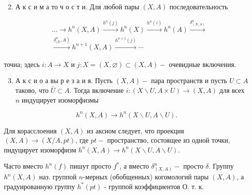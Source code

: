 \documentclass[10pt]{article}
\begin{document}
\begin{enumerate}

  \setcounter{enumi}{1}

  \item А к с и м а то ч о с т и. Для любой пары $(X, A)$ последовательность

\end{enumerate}



\[

\begin{aligned}

& \ldots \rightarrow h^{n}(X, A) \stackrel{h^{n}(j)}{\longrightarrow} h^{n}(X) \stackrel{h^{n}(i)}{\longrightarrow} h^{n}(A) \stackrel{\delta_{(X, A)}^{n}}{\longrightarrow} \\

& \stackrel{\left.\delta_{(X}^{n}, A\right)}{\longrightarrow} h^{n+1}(X, A) \stackrel{h^{n+1}(j)}{\longrightarrow} \cdots

\end{aligned}

\]



точна; здесь $i: A \rightarrow X$ и $j: X=(X, \varnothing) \subset(X, A)-$ очевидные включения.



\begin{enumerate}

  \setcounter{enumi}{2}

  \item А к с и о а вы р е з а и я. Пусть $(X, A)-$ пара пространств и пусть $U \subset A$ таково, что $\bar{U} \subset A$. Тогда включение $i:(X \backslash U, A \times U) \rightarrow(X, A)$ для всех $n$ индуцирует изоморфизмы

\end{enumerate}



\[

h^{n}(X, A) \rightarrow h^{n}(X \backslash U, A \backslash U) .

\]



Для корасслоения $(X, A)$ из аксиом следует, что проекция $(X, A) \rightarrow(X / A, p t)$, где $p t-$ пространство, состоящее из одной точки, пндуцирует изоморфизм $h^{n}(X, A) \rightarrow h^{n}(X \backslash U, A \backslash U)$.



Часто вместо $h^{n}(f)$ пишут просто $f^{*}$, а вместо $\delta_{(X, A)}^{n}-$ просто $\delta$. Группу $h^{n}(X, A)$ наз. группой $n$-мерных (обобщенных) когомологий пары $(X, A)$, а градуированную группу $h^{*}(p t)$ - группой коэффициентов О. т. к.
\end{document}
